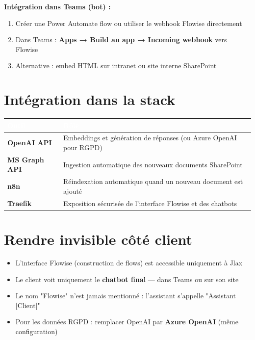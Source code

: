 \documentclass[11pt, a4paper]{article}
\begin{document}
\textbf{Intégration dans Teams (bot) :}
\begin{enumerate}
  \item Créer une Power Automate flow ou utiliser le webhook Flowise directement
  \item Dans Teams : \textbf{Apps → Build an app → Incoming webhook} vers Flowise
  \item Alternative : embed HTML sur intranet ou site interne SharePoint
\end{enumerate}

\section{Intégration dans la stack}

\begin{center}
\renewcommand{\arraystretch}{1.4}
\begin{tabularx}{\linewidth}{>{\bfseries}p{2.8cm} X}
\toprule
\rowcolor{tabheader}
\textcolor{white}{\textbf{Outil}} & \textcolor{white}{\textbf{Rôle}} \\
\midrule
OpenAI API & Embeddings et génération de réponses (ou Azure OpenAI pour RGPD) \\
\rowcolor{rowgray}
MS Graph API & Ingestion automatique des nouveaux documents SharePoint \\
n8n & Réindexation automatique quand un nouveau document est ajouté \\
\rowcolor{rowgray}
Traefik & Exposition sécurisée de l'interface Flowise et des chatbots \\
\bottomrule
\end{tabularx}
\end{center}

\section{Rendre invisible côté client}

\begin{itemize}
  \item L'interface Flowise (construction de flows) est accessible uniquement à Jlax
  \item Le client voit uniquement le \textbf{chatbot final} — dans Teams ou sur son site
  \item Le nom "Flowise" n'est jamais mentionné : l'assistant s'appelle "Assistant [Client]"
  \item Pour les données RGPD : remplacer OpenAI par \textbf{Azure OpenAI} (même configuration)
\end{itemize}
\end{document}
